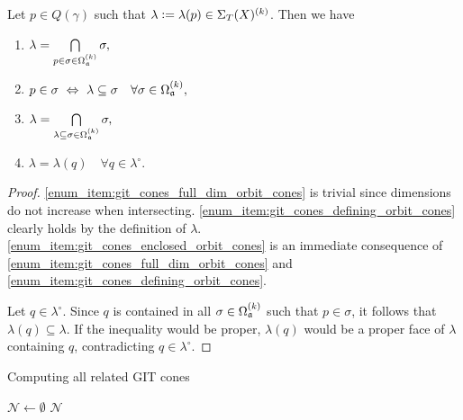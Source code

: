 \begin{lemma}
	\label{lemma:git_cones_elementary_properties}
	Let $p\in Q(\gamma)$ such that $\lambda \mathrel{\mathop:}= \lambda(p)\in\Sigma_T(X)^{(k)}$. Then we have
	\begin{enumerate}[label={\upshape(\roman*)}]
		\item $\lambda = \bigcap\limits_{p\in\sigma\in\Omega_{\mathfrak{a}}^{(k)}}\sigma,$
			\label{enum_item:git_cones_full_dim_orbit_cones}
		\item $p\in\sigma\ \Leftrightarrow\ \lambda\subseteq\sigma\quad\forall\sigma\in\Omega_\ideal^{(k)},$
			\label{enum_item:git_cones_defining_orbit_cones}
		\item $\lambda = \bigcap\limits_{\lambda\subseteq\sigma\in\Omega_{\mathfrak{a}}^{(k)}}\sigma,$
			\label{enum_item:git_cones_enclosed_orbit_cones}
		\item $\lambda = \lambda(q)\quad \forall q\in\lambda^\circ.$
			\label{enum_item:git_cones_relative_interior}
	\end{enumerate}
\end{lemma}
\begin{proof}
	\ref{enum_item:git_cones_full_dim_orbit_cones} is trivial since dimensions do not increase when intersecting. \ref{enum_item:git_cones_defining_orbit_cones} clearly holds by the definition of $\lambda$. \ref{enum_item:git_cones_enclosed_orbit_cones} is an immediate consequence of \ref{enum_item:git_cones_full_dim_orbit_cones} and \ref{enum_item:git_cones_defining_orbit_cones}.
	
	Let $q\in\lambda^\circ$. Since $q$ is contained in all $\sigma\in\Omega_{\mathfrak{a}}^{(k)}$ such that $p\in\sigma$, it follows that $\lambda(q)\subseteq\lambda$. If the inequality would be proper, $\lambda(q)$ would be a proper face of $\lambda$ containing $q$, contradicting $q\in\lambda^\circ$.
\end{proof}

\begin{algorithm}
	\caption{Computing all related GIT cones}
	\label{algo:compute_git_cone_neighbours}
	
	\BlankLine
	$\mathcal{N} \leftarrow \emptyset$\;
	\Return $\mathcal{N}$\;
\end{algorithm}

